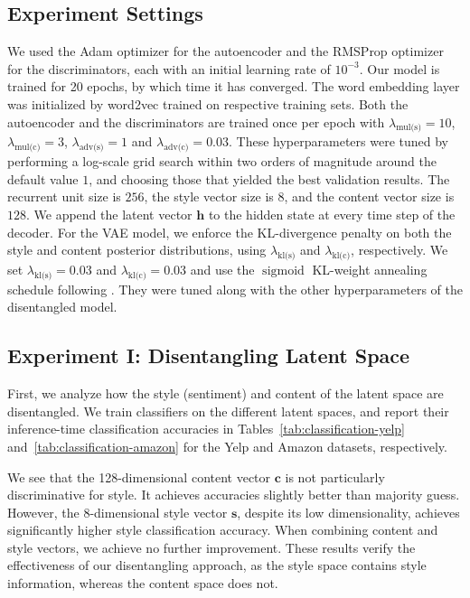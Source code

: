 \documentclass[letterpaper]{article} %
\newcommand{\hyp}[1]{\lambda_{\text{#1}}}
\newcommand{\citeay}[1]{\citeauthor{#1} \shortcite{#1}}
\begin{document}
\subsection{Experiment Settings}
We used the Adam optimizer \cite{kingma2014adam} for the autoencoder and the RMSProp optimizer \cite{tieleman2012lecture} for the discriminators, each with an initial learning rate of $10^{-3}$.
Our model is trained for 20 epochs, by which time it has converged.
The word embedding layer was initialized by word2vec \cite{mikolov2013distributed} trained on respective training sets.
Both the autoencoder and the discriminators are trained once per epoch with $\hyp{mul(s)} = 10$, $\hyp{mul(c)} = 3$, $\hyp{adv(s)} = 1$ and $\hyp{adv(c)} = 0.03$.
These hyperparameters were tuned by performing a log-scale grid search within two orders of magnitude around the default value $1$, and choosing those that yielded the best validation results.
The recurrent unit size is $256$, the style vector size is $8$, and the content vector size is $128$.
We append the latent vector $\bm h$ to the hidden state at every time step of the decoder.
For the VAE model, we enforce the KL-divergence penalty on both the style and content posterior distributions, using $\hyp{kl(s)}$ and $\hyp{kl(c)}$, respectively.
We set $\hyp{kl(s)} = 0.03$ and $\hyp{kl(c)} = 0.03$ and use the $\operatorname{sigmoid}$ KL-weight annealing schedule following \citeay{bahuleyan2018probabilistic}. They were tuned along with the other hyperparameters of the disentangled model.




\subsection{Experiment I: Disentangling Latent Space}

First, we analyze how the style (sentiment) and content of the latent space are disentangled.
We train classifiers on the different latent spaces, and report their inference-time classification accuracies in Tables~\ref{tab:classification-yelp} and~\ref{tab:classification-amazon} for the Yelp and Amazon datasets, respectively.

We see that the 128-dimensional content vector $\bm c$ is not particularly discriminative for style.
It achieves accuracies slightly better than majority guess.
However, the 8-dimensional style vector $\bm s$, despite its low dimensionality, achieves significantly higher style classification accuracy.
When combining content and style vectors, we achieve no further improvement.
These results verify the effectiveness of our disentangling approach, as the style space contains style information, whereas the content space does not.
\end{document}
